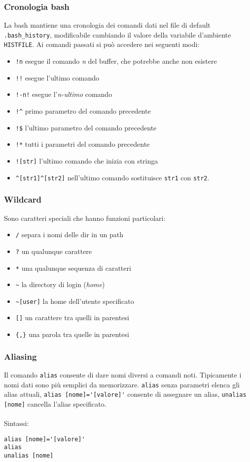 \documentclass[a4paper]{article}
\begin{document}
\subsubsection{Cronologia bash} La bash mantiene una cronologia dei comandi dati nel file di default \verb|.bash_history|, modificabile cambiando il valore della variabile d'ambiente \verb|HISTFILE|.
Ai comandi passati si può accedere nei seguenti modi:
\begin{itemize}
\item \verb|!n| esegue il comando \textit{n} del buffer, che potrebbe anche non esistere
\item \verb|!!| esegue l'ultimo comando
\item \verb|!-n!| esegue l'\textit{n-ultimo} comando
\item \verb|!^| primo parametro del comando precedente
\item \verb|!$| l'ultimo parametro del comando precedente
\item \verb|!*| tutti i parametri del comando precedente
\item \verb|![str]| l'ultimo comando che inizia con stringa
\item \verb|^[str1]^[str2]| nell'ultimo comando sostituisce \verb|str1| con \verb|str2|.
\end{itemize}

\subsubsection{Wildcard} Sono caratteri speciali che hanno funzioni particolari:
\begin{itemize}
\item \verb|/| separa i nomi delle dir in un path
\item \verb|?| un qualunque carattere
\item \verb|*| una qualunque sequenza di caratteri
\item \verb|~| la directory di login (\textit{home})
\item \verb|~[user]| la home dell'utente specificato
\item \verb|[]| un carattere tra quelli in parentesi
\item \verb|{,}| una parola tra quelle in parentesi
\end{itemize}

\subsubsection{Aliasing} Il comando \verb|alias| consente di dare nomi diversi a comandi noti. Tipicamente i nomi dati sono più semplici da memorizzare. \verb|alias| senza parametri elenca gli alias attuali, \verb|alias [nome]='[valore]'| consente di assegnare un alias, \verb|unalias [nome]| cancella l'alias specificato.\\ \\
Sintassi:
\begin{verbatim}
alias [nome]='[valore]'
alias
unalias [nome]
\end{verbatim}
\end{document}
